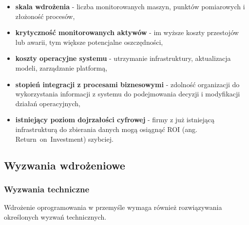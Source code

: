 \begin{itemize}
    \item \textbf{skala wdrożenia} - liczba monitorowanych maszyn, punktów pomiarowych i złożoność procesów,
    \item \textbf{krytyczność monitorowanych aktywów} - im wyższe koszty przestojów lub awarii, tym większe potencjalne oszczędności,
    \item \textbf{koszty operacyjne systemu} - utrzymanie infrastruktury, aktualizacja modeli, zarządzanie platformą,
    \item \textbf{stopień integracji z procesami biznesowymi} - zdolność organizacji do wykorzystania informacji z systemu do podejmowania decyzji i modyfikacji działań operacyjnych,
    \item \textbf{istniejący poziom dojrzałości cyfrowej} - firmy z już istniejącą infrastrukturą do zbierania danych mogą osiągnąć ROI (ang. \mbox{Return on Investment}) szybciej.
\end{itemize}

\newpage

\subsection{Wyzwania wdrożeniowe}
\label{subsec:wyzwania_wdrozeniowe}

\subsubsection{Wyzwania techniczne}
\label{subsubsec:wyzwania_techniczne}

Wdrożenie oprogramowania w przemyśle wymaga również rozwiązywania określonych wyzwań technicznych.

\vspace{0.3em}

